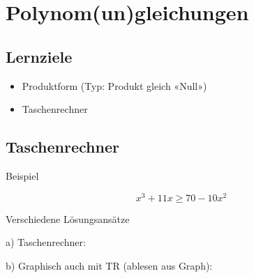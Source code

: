 
\section{Polynom(un)gleichungen}


\subsection*{Lernziele}

\begin{itemize}
\item Produktform (Typ: Produkt gleich «Null»)
\item Taschenrechner
\end{itemize}

\newpage


\newpage

\newpage

\subsection{Taschenrechner}
Beispiel

$$x^3 + 11x  \ge{} 70 - 10x^2$$

Verschiedene Lösungsansätze


a) Taschenrechner: 

\leserluft{}

b) Graphisch auch mit TR (ablesen aus Graph):

